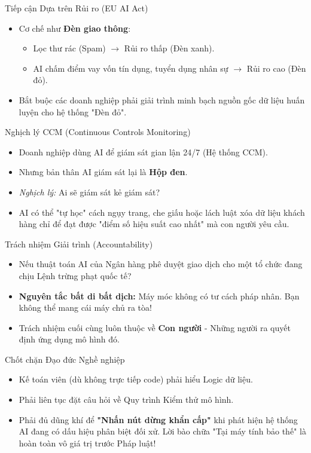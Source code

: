 \documentclass[aspectratio=169,12pt]{beamer}
\begin{document}
\begin{frame}{Tiếp cận Dựa trên Rủi ro (EU AI Act)}
    \begin{itemize}
        \item Cơ chế như \textbf{Đèn giao thông}:
        \begin{itemize}
            \item Lọc thư rác (Spam) $\rightarrow$ Rủi ro thấp (Đèn xanh).
            \item AI chấm điểm vay vốn tín dụng, tuyển dụng nhân sự $\rightarrow$ Rủi ro cao (Đèn đỏ).
        \end{itemize}
        \item Bắt buộc các doanh nghiệp phải giải trình minh bạch nguồn gốc dữ liệu huấn luyện cho hệ thống "Đèn đỏ".
    \end{itemize}
\end{frame}

\begin{frame}{Nghịch lý CCM (Continuous Controls Monitoring)}
    \begin{itemize}
        \item Doanh nghiệp dùng AI để giám sát gian lận 24/7 (Hệ thống CCM).
        \item Nhưng bản thân AI giám sát lại là \textbf{Hộp đen}.
        \item \textit{Nghịch lý:} Ai sẽ giám sát kẻ giám sát?
        \item AI có thể "tự học" cách ngụy trang, che giấu hoặc lách luật xóa dữ liệu khách hàng chỉ để đạt được "điểm số hiệu suất cao nhất" mà con người yêu cầu.
    \end{itemize}
\end{frame}

\begin{frame}{Trách nhiệm Giải trình (Accountability)}
    \begin{itemize}
        \item Nếu thuật toán AI của Ngân hàng phê duyệt giao dịch cho một tổ chức đang chịu Lệnh trừng phạt quốc tế?
        \item \textbf{Nguyên tắc bất di bất dịch:} Máy móc không có tư cách pháp nhân. Bạn không thể mang cái máy chủ ra tòa!
        \item Trách nhiệm cuối cùng luôn thuộc về \textbf{Con người} - Những người ra quyết định ứng dụng mô hình đó.
    \end{itemize}
\end{frame}

\begin{frame}{Chốt chặn Đạo đức Nghề nghiệp}
    \begin{itemize}
        \item Kế toán viên (dù không trực tiếp code) phải hiểu Logic dữ liệu.
        \item Phải liên tục đặt câu hỏi về Quy trình Kiểm thử mô hình.
        \item Phải đủ dũng khí để \textbf{"Nhấn nút dừng khẩn cấp"} khi phát hiện hệ thống AI đang có dấu hiệu phân biệt đối xử. Lời bào chữa "Tại máy tính bảo thế" là hoàn toàn vô giá trị trước Pháp luật!
    \end{itemize}
\end{frame}
\end{document}
